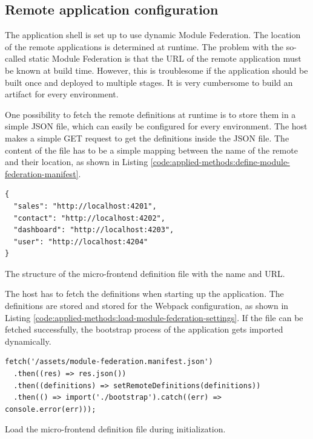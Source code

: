 \subsection{Remote application configuration}\label{subsection:applied-methods:prototypical-implementation
:load-remote-settings}

The application shell is set up to use dynamic Module Federation. The location of the remote applications is determined at runtime. The problem with the so-called static Module Federation is that the \ac{URL} of the remote application must be known at build time. However, this is troublesome if the application should be built once and deployed to multiple stages. It is very cumbersome to build an artifact for every environment.

\bigskip

\noindent One possibility to fetch the remote definitions at runtime is to store them in a simple \ac{JSON} file, which can easily be configured for every environment. The host makes a simple GET request to get the definitions inside the \ac{JSON} file. The content of the file has to be a simple mapping between the name of the remote and their location, as shown in Listing \ref{code:applied-methods:define-module-federation-manifest}.

\ifshowListings
\begin{listing}[H]
\begin{verbatim}
{
  "sales": "http://localhost:4201",
  "contact": "http://localhost:4202",
  "dashboard": "http://localhost:4203",
  "user": "http://localhost:4204"
}
\end{verbatim}
\caption{The structure of the micro-frontend definition file with the name and \ac{URL}.}\label{code:applied-methods:define-module-federation-manifest}
\end{listing}
\fi

\noindent The host has to fetch the definitions when starting up the application. The definitions are stored and stored for the Webpack configuration, as shown in Listing \ref{code:applied-methods:load-module-federation-settings}. If the file can be fetched successfully, the bootstrap process of the application gets imported dynamically.

\ifshowListings
\begin{listing}[H]
\begin{verbatim}
fetch('/assets/module-federation.manifest.json')
  .then((res) => res.json())
  .then((definitions) => setRemoteDefinitions(definitions))
  .then(() => import('./bootstrap').catch((err) => console.error(err)));
\end{verbatim}
\caption{Load the micro-frontend definition file during initialization.}\label{code:applied-methods:load-module-federation-settings}
\end{listing}
\fi

